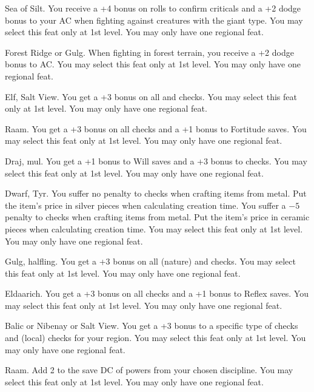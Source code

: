 {}
{Sea of Silt.}
{You receive a +4 bonus on rolls to confirm criticals and a +2 dodge bonus to your AC when fighting against creatures with the giant type.}
{}
{You may select this feat only at 1st level. You may only have one regional feat.}

{}
{Forest Ridge or Gulg.}
{When fighting in forest terrain, you receive a +2 dodge bonus to AC.}
{}
{You may select this feat only at 1st level. You may only have one regional feat.}

{}
{Elf, Salt View.}
{You get a +3 bonus on all  and  checks.}
{}
{You may select this feat only at 1st level. You may only have one regional feat.}

{}
{Raam.}
{You get a +3 bonus on all  checks and a +1 bonus to Fortitude saves.}
{}
{You may select this feat only at 1st level. You may only have one regional feat.}

{}
{Draj, mul.}
{You get a +1 bonus to Will saves and a +3 bonus to  checks.}
{}
{You may select this feat only at 1st level. You may only have one regional feat.}

{}
{Dwarf, Tyr.}
{You suffer no penalty to  checks when crafting items from metal. Put the item's price in silver pieces when calculating creation time.}
{You suffer a $-5$ penalty to  checks when crafting items from metal. Put the item's price in ceramic pieces when calculating creation time.}
{You may select this feat only at 1st level. You may only have one regional feat.}

{}
{Gulg, halfling.}
{You get a +3 bonus on all  (nature) and  checks.}
{}
{You may select this feat only at 1st level. You may only have one regional feat.}

{}
{Eldaarich.}
{You get a +3 bonus on all  checks and a +1 bonus to Reflex saves.}
{}
{You may select this feat only at 1st level. You may only have one regional feat.}

{}
{Balic or Nibenay or Salt View.}
{You get a +3 bonus to a specific type of  checks and  (local) checks for your region.}
{}
{You may select this feat only at 1st level. You may only have one regional feat.}

{}
{Raam.}
{Add 2 to the save DC of powers from your chosen discipline.}
{}
{You may select this feat only at 1st level. You may only have one regional feat.}